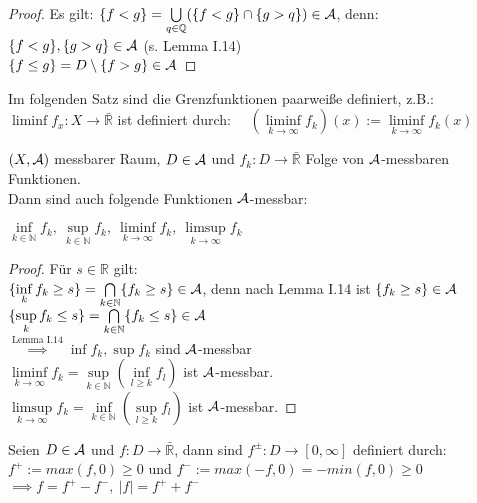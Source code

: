   \begin{proof}
    Es gilt: $\{f < g\} = \bigcup\limits_{q \in \mathbb{Q}} (\{f < g\} \cap \{g > q\}) \in \mathcal{A}$, denn:\\
    $\{f < g\}, \{g > q\} \in \mathcal{A}$ (s. Lemma I.14)\\
    $\{f \leq g\} = D \setminus \{f > g\} \in \mathcal{A}$
  \end{proof}

  \begin{remark}
    Im folgenden Satz sind die Grenzfunktionen paarweiße definiert, z.B.:\\
    $\liminf f_x : X \to \bar{\mathbb{R}}$ ist definiert durch: \ \ $(\liminf\limits_{k \to \infty} f_k)(x) := \liminf\limits_{k \to \infty} f_k (x)$
  \end{remark}

  \begin{theorem}
    $(X, \mathcal{A})$ messbarer Raum, $D \in \mathcal{A}$ und $f_k:D \to \bar{\mathbb{R}}$ Folge von $\mathcal{A}$-messbaren Funktionen.\\
    Dann sind auch folgende Funktionen $\mathcal{A}$-messbar:
    \begin{center}
      $\inf\limits_{k \in \mathbb{N}} f_k, \ \sup\limits_{k \in \mathbb{N}} f_k, \ \liminf\limits_{k \to \infty} f_k, \ \limsup\limits_{k \to \infty} f_k$
    \end{center}
  \end{theorem}

  \begin{proof}
    Für $s \in \mathbb{R}$ gilt:\\
    $\{\inf\limits_k f_k \geq s\} = \bigcap\limits_{k \in \mathbb{N}} \{f_k \geq s\} \in \mathcal{A}$, denn nach Lemma I.14 ist $\{f_k \geq s\} \in \mathcal{A}$\\
    $\{\sup\limits_k f_k \leq s\} = \bigcap\limits_{k \in \mathbb{N}} \{f_k \leq s\} \in \mathcal{A}$\\
    $\stackrel{\text{Lemma I.14}}{\implies} \inf f_k, \sup f_k$ sind $\mathcal{A}$-messbar\\
    $\liminf\limits_{k \to \infty} f_k = \sup\limits_{k \in \mathbb{N}} (\inf\limits_{l \geq k} f_l)$ ist $\mathcal{A}$-messbar.\\
    $\limsup\limits_{k \to \infty} f_k = \inf\limits_{k \in \mathbb{N}} (\sup\limits_{l \geq k} f_l)$ ist $\mathcal{A}$-messbar.
  \end{proof}

  \begin{notation}
    Seien $D \in \mathcal{A}$ und $f: D \to \bar{\mathbb{R}}$, dann sind $f^{\pm}:D \to [0, \infty]$ definiert durch:\\
    $f^+ := max(f, 0) \geq 0$ und $f^- := max(-f, 0) = -min(f, 0) \geq 0$\\
    $\implies f = f^+ - f^-, \ |f| = f^+ + f^-$
  \end{notation}

